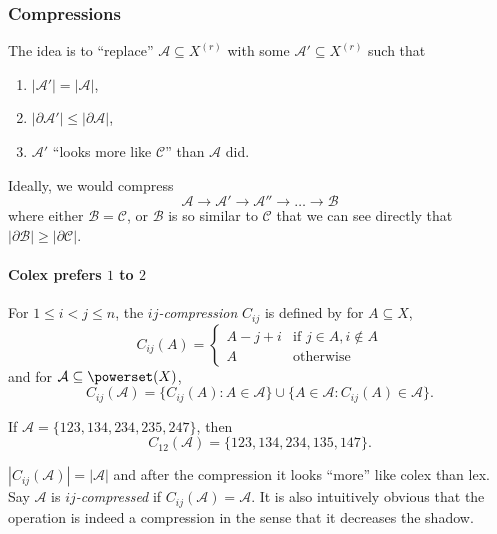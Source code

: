 \documentclass[a4paper]{article}
\newcommand{\shadow}{\partial}
\begin{document}
\subsubsection{Compressions}

The idea is to ``replace'' \(\mathcal A \subseteq X^{(r)}\) with some \(\mathcal A' \subseteq X^{(r)}\) such that
\begin{enumerate}
\item \(|\mathcal A'| = |\mathcal A|\),
\item \(|\shadow \mathcal A'| \leq |\shadow \mathcal A|\),
\item \(\mathcal A'\) ``looks more like \(\mathcal C\)'' than \(\mathcal A\) did.
\end{enumerate}

Ideally, we would compress
\[
  \mathcal A \to \mathcal A' \to \mathcal A'' \to \dots \to \mathcal B
\]
where either \(\mathcal B = \mathcal C\), or \(\mathcal B\) is so similar to \(\mathcal C\) that we can see directly that \(|\shadow \mathcal B| \geq |\shadow \mathcal C|\).

\paragraph{Colex prefers \(1\) to \(2\)}

\begin{definition}[\(ij\)-compression]
  For \(1 \leq i < j \leq n\), the \emph{\(ij\)-compression} \(C_{ij}\) is defined by for \(A \subseteq X\),
  \[
    C_{ij} (A) =
    \begin{cases}
      A - j + i & \text{if } j \in A, i \notin A \\
      A & \text{otherwise}
    \end{cases}
  \]
  and for \(\mathcal A \subseteq \powerset(X)\),
  \[
    C_{ij} (\mathcal A) = \{C_{ij}(A): A \in \mathcal A\} \cup \{A \in \mathcal A: C_{ij}(A) \in \mathcal A\}.
  \]
\end{definition}

\begin{eg}
  If \(\mathcal A = \{123, 134, 234, 235, 247\}\), then
  \[
    C_{12}(\mathcal A) = \{123, 134, 234, 135, 147\}.
  \]
\end{eg}

\(|C_{ij}(\mathcal A)| = |\mathcal A|\) and after the compression it looks ``more'' like colex than lex. Say \(\mathcal A\) is \emph{\(ij\)-compressed} if \(C_{ij}(\mathcal A) = \mathcal A\). It is also intuitively obvious that the operation is indeed a compression in the sense that it decreases the shadow.
\end{document}

